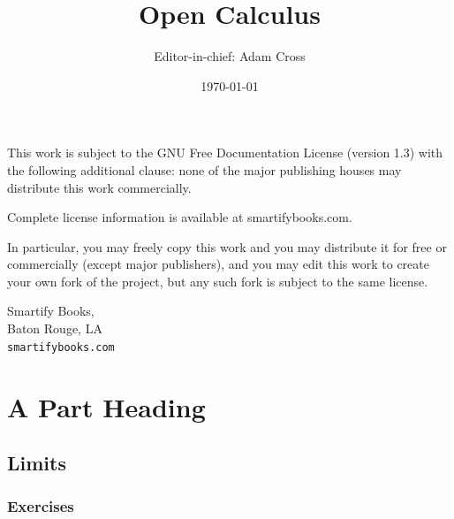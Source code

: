 \documentclass[11pt]{book}
\title{\bf Open Calculus}    %
\author{Editor-in-chief: Adam Cross}
\date{\today}                           %
\begin{document}
\frontmatter                            %
\maketitle                              %


\pagestyle{empty}
\begingroup
\footnotesize
\parindent 0pt
\parskip \baselineskip

This work is subject to the GNU Free Documentation License (version 1.3) with the following additional clause: none of the major publishing houses may distribute this work commercially.

Complete license information is available at smartifybooks.com.

In particular, you may freely copy this work and you may distribute it for free or commercially (except major publishers), and you may edit this work to create your own fork of the project, but any such fork is subject to the same license.  


\vfill

Smartify Books, \\
Baton Rouge, LA \\
\texttt{smartifybooks.com}

\vspace*{2\baselineskip}


\endgroup
\clearpage








\tableofcontents                        %








\mainmatter                             %

\part{A Part Heading}                   %



\chapter{Limits}     


\section{Exercises}
\end{document}

